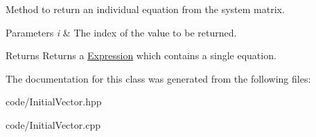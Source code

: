 Method to return an individual equation from the system matrix. 


\begin{DoxyParams}{Parameters}
{\em i} & The index of the value to be returned. \\
\hline
\end{DoxyParams}
\begin{DoxyReturn}{Returns}
Returns a \hyperlink{class_expression}{Expression} which contains a single equation. 
\end{DoxyReturn}


The documentation for this class was generated from the following files\+:\begin{DoxyCompactItemize}
\item 
code/Initial\+Vector.\+hpp\item 
code/Initial\+Vector.\+cpp\end{DoxyCompactItemize}
